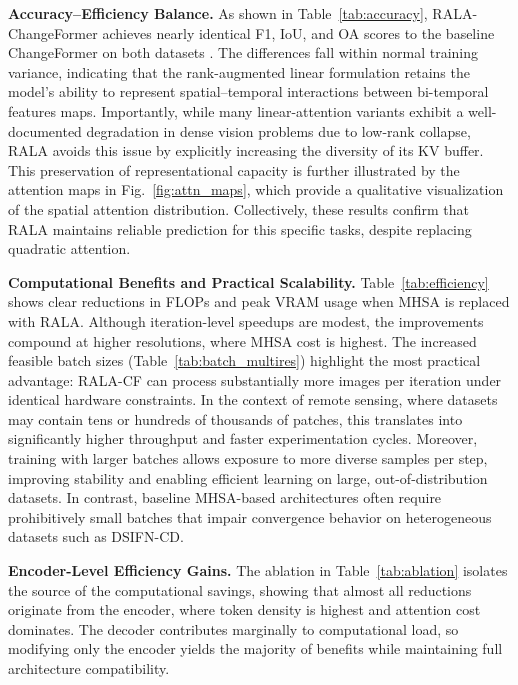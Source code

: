 \documentclass[runningheads]{llncs}
\begin{document}
\noindent \textbf{Accuracy–Efficiency Balance.}
As shown in Table~\ref{tab:accuracy}, RALA-ChangeFormer achieves nearly
identical F1, IoU, and OA scores to the baseline ChangeFormer on both datasets
\cite{Zheng2020LEVIR,Zhang2020FusionNetDSIFN}. The differences fall within normal training
variance, indicating that the rank-augmented linear formulation retains the
model's ability to represent spatial–temporal interactions between bi-temporal
features maps. Importantly, while many linear-attention variants
\cite{Choromanski2021Performer,Wang2020Linformer,Xiong2021Nystromformer} exhibit
a well-documented degradation in dense vision problems due to low-rank collapse,
RALA avoids this issue by explicitly increasing the diversity of its KV buffer.
This preservation of representational capacity is further illustrated by the
attention maps in Fig.~\ref{fig:attn_maps}, which provide a qualitative
visualization of the spatial attention distribution. Collectively, these results
confirm that RALA maintains reliable prediction for this specific tasks, despite
replacing quadratic attention.


\noindent \textbf{Computational Benefits and Practical Scalability.}
Table~\ref{tab:efficiency} shows clear reductions in FLOPs and peak VRAM usage
when MHSA is replaced with RALA. Although iteration-level speedups are modest,
the improvements compound at higher resolutions, where MHSA cost is highest.
The increased feasible batch sizes (Table~\ref{tab:batch_multires}) highlight
the most practical advantage: RALA-CF can process substantially more images per
iteration under identical hardware constraints. In the context of remote
sensing, where datasets may contain tens or hundreds of thousands of patches,
this translates into significantly higher throughput and faster experimentation
cycles. Moreover, training with larger batches allows exposure to more diverse
samples per step, improving stability and enabling efficient learning on large,
out-of-distribution datasets. In contrast, baseline MHSA-based architectures
often require prohibitively small batches that impair convergence behavior on
heterogeneous datasets such as DSIFN-CD.

\noindent \textbf{Encoder-Level Efficiency Gains.}
The ablation in Table~\ref{tab:ablation} isolates the source of the
computational savings, showing that almost all reductions originate from the
encoder, where token density is highest and attention cost dominates. The
decoder contributes marginally to computational load, so modifying only the
encoder yields the majority of benefits while maintaining full architecture
compatibility.
\end{document}

